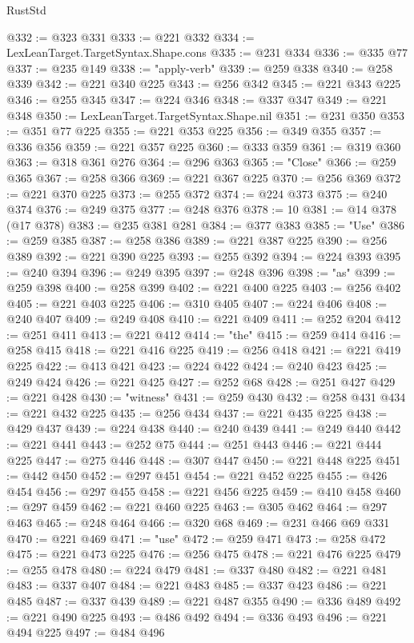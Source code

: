 \begin{lexlean}{RustStd}
\begin{coremodule}
@332 := @323 @331
@333 := @221 @332
@334 := LexLeanTarget.TargetSyntax.Shape.cons
@335 := @231 @334
@336 := @335 @77
@337 := @235 @149
@338 := "apply-verb"
@339 := @259 @338
@340 := @258 @339
@342 := @221 @340 @225
@343 := @256 @342
@345 := @221 @343 @225
@346 := @255 @345
@347 := @224 @346
@348 := @337 @347
@349 := @221 @348
@350 := LexLeanTarget.TargetSyntax.Shape.nil
@351 := @231 @350
@353 := @351 @77 @225
@355 := @221 @353 @225
@356 := @349 @355
@357 := @336 @356
@359 := @221 @357 @225
@360 := @333 @359
@361 := @319 @360
@363 := @318 @361 @276
@364 := @296 @363
@365 := "Close"
@366 := @259 @365
@367 := @258 @366
@369 := @221 @367 @225
@370 := @256 @369
@372 := @221 @370 @225
@373 := @255 @372
@374 := @224 @373
@375 := @240 @374
@376 := @249 @375
@377 := @248 @376
@378 := 10
@381 := @14 @378 (@17 @378)
@383 := @235 @381 @281
@384 := @377 @383
@385 := "Use"
@386 := @259 @385
@387 := @258 @386
@389 := @221 @387 @225
@390 := @256 @389
@392 := @221 @390 @225
@393 := @255 @392
@394 := @224 @393
@395 := @240 @394
@396 := @249 @395
@397 := @248 @396
@398 := "as"
@399 := @259 @398
@400 := @258 @399
@402 := @221 @400 @225
@403 := @256 @402
@405 := @221 @403 @225
@406 := @310 @405
@407 := @224 @406
@408 := @240 @407
@409 := @249 @408
@410 := @221 @409
@411 := @252 @204
@412 := @251 @411
@413 := @221 @412
@414 := "the"
@415 := @259 @414
@416 := @258 @415
@418 := @221 @416 @225
@419 := @256 @418
@421 := @221 @419 @225
@422 := @413 @421
@423 := @224 @422
@424 := @240 @423
@425 := @249 @424
@426 := @221 @425
@427 := @252 @68
@428 := @251 @427
@429 := @221 @428
@430 := "witness"
@431 := @259 @430
@432 := @258 @431
@434 := @221 @432 @225
@435 := @256 @434
@437 := @221 @435 @225
@438 := @429 @437
@439 := @224 @438
@440 := @240 @439
@441 := @249 @440
@442 := @221 @441
@443 := @252 @75
@444 := @251 @443
@446 := @221 @444 @225
@447 := @275 @446
@448 := @307 @447
@450 := @221 @448 @225
@451 := @442 @450
@452 := @297 @451
@454 := @221 @452 @225
@455 := @426 @454
@456 := @297 @455
@458 := @221 @456 @225
@459 := @410 @458
@460 := @297 @459
@462 := @221 @460 @225
@463 := @305 @462
@464 := @297 @463
@465 := @248 @464
@466 := @320 @68
@469 := @231 @466 @69 @331
@470 := @221 @469
@471 := "use"
@472 := @259 @471
@473 := @258 @472
@475 := @221 @473 @225
@476 := @256 @475
@478 := @221 @476 @225
@479 := @255 @478
@480 := @224 @479
@481 := @337 @480
@482 := @221 @481
@483 := @337 @407
@484 := @221 @483
@485 := @337 @423
@486 := @221 @485
@487 := @337 @439
@489 := @221 @487 @355
@490 := @336 @489
@492 := @221 @490 @225
@493 := @486 @492
@494 := @336 @493
@496 := @221 @494 @225
@497 := @484 @496

\end{coremodule}
\end{lexlean}

